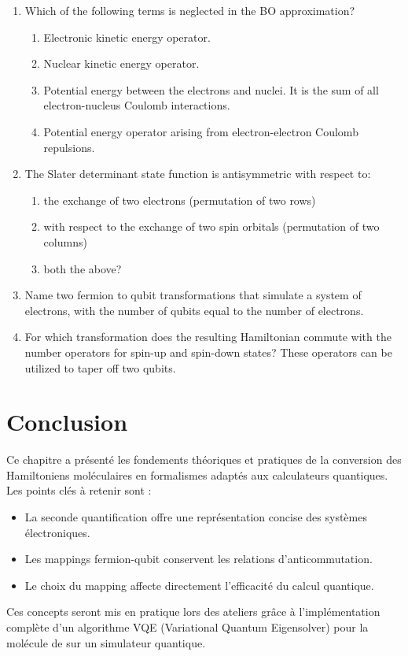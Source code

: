 \documentclass[12pt,a4paper,svgnames,x11names,rgb,table]{article} %
\numberwithin{equation}{section} %
\numberwithin{figure}{section} %
\numberwithin{table}{section} %
\begin{document}
\begin{enumerate}
\item Which of the following terms is neglected in the BO approximation?
\begin{enumerate}
\item Electronic kinetic energy operator.
\item Nuclear kinetic energy operator.
\item Potential energy between the electrons and nuclei. It is the sum of all electron-nucleus Coulomb interactions.
\item Potential energy operator arising from electron-electron Coulomb repulsions.
\end{enumerate}
    
\item The Slater determinant state function is antisymmetric with respect to: 
\begin{enumerate}
\item the exchange of two electrons (permutation of two rows) 
\item with respect to the exchange of two spin orbitals (permutation of two columns)
\item both the above?
\end{enumerate}

\item Name two fermion to qubit transformations that simulate a system of electrons, with the number of qubits equal to the number of electrons.

\item For which transformation does the resulting Hamiltonian commute with the number operators for spin-up and spin-down states? These operators can be utilized to taper off two qubits.
\end{enumerate}


\section*{Conclusion}

Ce chapitre a présenté les fondements théoriques et pratiques de la conversion des Hamiltoniens moléculaires en formalismes adaptés aux calculateurs quantiques. Les points clés à retenir sont :

\begin{itemize}
    \item La seconde quantification offre une représentation concise des systèmes électroniques.
    \item Les mappings fermion-qubit conservent les relations d'anticommutation.
    \item Le choix du mapping affecte directement l'efficacité du calcul quantique.
\end{itemize}

Ces concepts seront mis en pratique lors des ateliers grâce à l'implémentation complète d'un algorithme VQE (Variational Quantum Eigensolver) pour la molécule de  sur un simulateur quantique.
\end{document}
